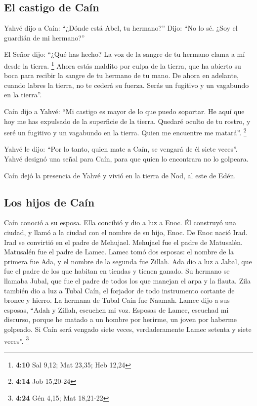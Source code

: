 \begin{paracol}{2}
\hypertarget{el-castigo-de-cauxedn}{%
\subsection{El castigo de Caín}\label{el-castigo-de-cauxedn}}

 Yahvé dijo a Caín: ``¿Dónde está Abel, tu hermano?''
Dijo: ``No lo sé. ¿Soy el guardián de mi hermano?''

 El Señor dijo: ``¿Qué has hecho? La voz de la sangre de
tu hermano clama a mí desde la tierra. \footnote{\textbf{4:10} Sal 9,12;
  Mat 23,35; Heb 12,24}  Ahora estás maldito por culpa de
la tierra, que ha abierto su boca para recibir la sangre de tu hermano
de tu mano.  De ahora en adelante, cuando labres la
tierra, no te cederá su fuerza. Serás un fugitivo y un vagabundo en la
tierra''.

 Caín dijo a Yahvé: ``Mi castigo es mayor de lo que puedo
soportar.  He aquí que hoy me has expulsado de la
superficie de la tierra. Quedaré oculto de tu rostro, y seré un fugitivo
y un vagabundo en la tierra. Quien me encuentre me matará''. \footnote{\textbf{4:14}
  Job 15,20-24}

 Yahvé le dijo: ``Por lo tanto, quien mate a Caín, se
vengará de él siete veces''. Yahvé designó una señal para Caín, para que
quien lo encontrara no lo golpeara.

 Caín dejó la presencia de Yahvé y vivió en la tierra de
Nod, al este de Edén.

\hypertarget{los-hijos-de-cauxedn}{%
\subsection{Los hijos de Caín}\label{los-hijos-de-cauxedn}}

 Caín conoció a su esposa. Ella concibió y dio a luz a
Enoc. Él construyó una ciudad, y llamó a la ciudad con el nombre de su
hijo, Enoc.  De Enoc nació Irad. Irad se convirtió en el
padre de Mehujael. Mehujael fue el padre de Matusalén. Matusalén fue el
padre de Lamec.  Lamec tomó dos esposas: el nombre de la
primera fue Ada, y el nombre de la segunda fue Zillah. 
Ada dio a luz a Jabal, que fue el padre de los que habitan en tiendas y
tienen ganado.  Su hermano se llamaba Jubal, que fue el
padre de todos los que manejan el arpa y la flauta.  Zila
también dio a luz a Tubal Caín, el forjador de todo instrumento cortante
de bronce y hierro. La hermana de Tubal Caín fue Naamah. 
Lamec dijo a sus esposas, ``Adah y Zillah, escuchen mi voz. Esposas de
Lamec, escuchad mi discurso, porque he matado a un hombre por herirme,
un joven por haberme golpeado.  Si Caín será vengado
siete veces, verdaderamente Lamec setenta y siete veces''. \footnote{\textbf{4:24}
  Gén 4,15; Mat 18,21-22}


\end{paracol}
